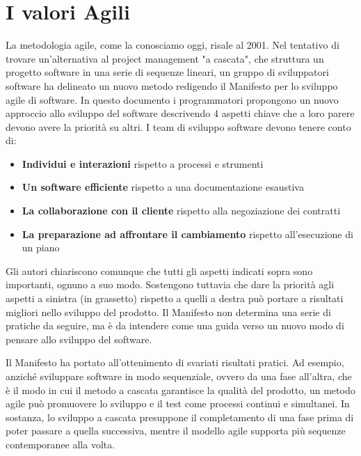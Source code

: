 \documentclass[a4paper,12pt,titlepage,oneside]{book}
\begin{document}
\section{I valori Agili}
    La metodologia agile, come la conosciamo oggi, risale al 2001. Nel tentativo di trovare un'alternativa al project management "a cascata", che struttura un progetto software in una serie di sequenze lineari, un gruppo di sviluppatori software ha delineato un nuovo metodo 
    redigendo il Manifesto per lo sviluppo agile di software. In questo documento i programmatori propongono un nuovo approccio allo sviluppo del software descrivendo 4 aspetti chiave che a loro parere devono avere la priorità su altri. I team di sviluppo software devono tenere conto di:
    
    \begin{itemize}
        \item \textbf{Individui e interazioni} rispetto a processi e strumenti
        \item \textbf{Un software efficiente} rispetto a una documentazione esaustiva
        \item \textbf{La collaborazione con il cliente} rispetto alla negoziazione dei contratti
        \item \textbf{La preparazione ad affrontare il cambiamento} rispetto all'esecuzione di un piano
    \end{itemize}

    Gli autori chiariscono comunque che tutti gli aspetti indicati sopra sono importanti, ognuno a suo modo. Sostengono tuttavia che dare la priorità agli aspetti a sinistra (in grassetto) rispetto a quelli a destra può portare a risultati migliori nello sviluppo del prodotto. 
    Il Manifesto non determina una serie di pratiche da seguire, ma è da intendere come una guida verso un nuovo modo di pensare allo sviluppo del software.
    
    Il Manifesto ha portato all'ottenimento di svariati risultati pratici. Ad esempio, anziché sviluppare software in modo sequenziale, ovvero da una fase all'altra, che è il modo in cui il metodo a cascata garantisce la qualità del prodotto, un metodo agile può promuovere lo sviluppo 
    e il test come processi continui e simultanei. In sostanza, lo sviluppo a cascata presuppone il completamento di una fase prima di poter passare a quella successiva, mentre il modello agile supporta più sequenze contemporanee alla volta. 
\end{document}
